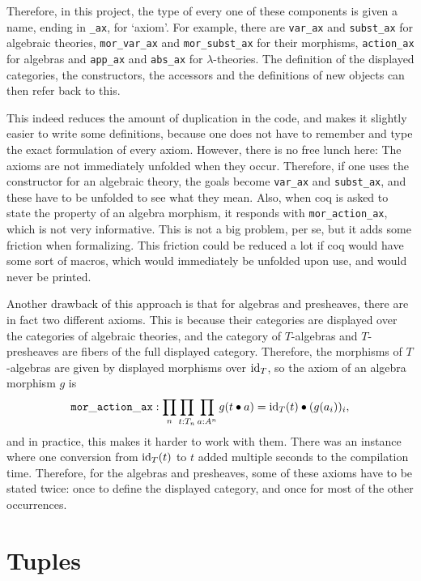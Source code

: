 Therefore, in this project, the type of every one of these components is given a name, ending in \texttt{\_ax}, for `axiom'. For example, there are \texttt{var\_ax} and \texttt{subst\_ax} for algebraic theories, \texttt{mor\_var\_ax} and \texttt{mor\_subst\_ax} for their morphisms, \texttt{action\_ax} for algebras and \texttt{app\_ax} and \texttt{abs\_ax} for $ \lambda $-theories. The definition of the displayed categories, the constructors, the accessors and the definitions of new objects can then refer back to this.

This indeed reduces the amount of duplication in the code, and makes it slightly easier to write some definitions, because one does not have to remember and type the exact formulation of every axiom. However, there is no free lunch here: The axioms are not immediately unfolded when they occur. Therefore, if one uses the constructor for an algebraic theory, the goals become \texttt{var\_ax} and \texttt{subst\_ax}, and these have to be unfolded to see what they mean. Also, when coq is asked to state the property of an algebra morphism, it responds with \texttt{mor\_action\_ax}, which is not very informative. This is not a big problem, per se, but it adds some friction when formalizing. This friction could be reduced a lot if coq would have some sort of macros, which would immediately be unfolded upon use, and would never be printed.

Another drawback of this approach is that for algebras and presheaves, there are in fact two different axioms. This is because their categories are displayed over the categories of algebraic theories, and the category of $ T $-algebras and $ T $-presheaves are fibers of the full displayed category. Therefore, the morphisms of $ T $-algebras are given by displayed morphisms over $ \text{id}_{T} $, so the axiom of an algebra morphism $ g $ is
\[ \mathtt{mor\_action\_ax}: \prod_n \prod_{t : T_n} \prod_{a : A^n} g (t \bullet a) = \text{id}_{T}(t) \bullet (g (a_i))_i, \]
and in practice, this makes it harder to work with them. There was an instance where one conversion from $ \text{id}_{T}(t) $ to $ t $ added multiple seconds to the compilation time. Therefore, for the algebras and presheaves, some of these axioms have to be stated twice: once to define the displayed category, and once for most of the other occurrences.

\section{Tuples}

